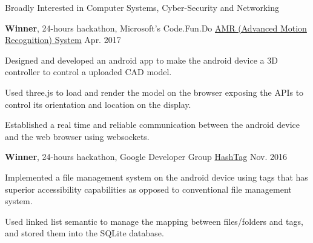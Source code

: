 \documentclass[11pt, a4paper]{cv}
\begin{document}

\begin{cventries}
    \begin{flushleft}
        Broadly Interested in Computer Systems, Cyber-Security and Networking
    \end{flushleft}
\end{cventries}


\begin{cventries}

  \cventry
  {\textbf{Winner}, 24-hours hackathon, Microsoft's Code.Fun.Do} %
        {\href{https://github.com/shivnshu/AMR-System}{AMR (Advanced Motion Recognition) System}} %
    {} %
    {Apr. 2017} %
    {
      \begin{cvitems} %
        \item {Designed and developed an android app to make the android device a 3D controller to control a uploaded CAD model.}
        \item {Used three.js to load and render the model on the browser exposing the APIs to control its orientation and location on the display.}
        \item {Established a real time and reliable communication between the android device and the web browser using websockets.}
      \end{cvitems}
    }

%
  \cventry
  {\textbf{Winner}, 24-hours hackathon, Google Developer Group} %
        {\href{https://github.com/shivnshu/hashtag}{HashTag}} %
    {} %
    {Nov. 2016} %
    {
      \begin{cvitems} %
        \item {Implemented a file management system on the android device using tags that has superior accessibility capabilities as opposed to conventional file management system.}
        \item {Used linked list semantic to manage the mapping between files/folders and tags, and stored them into the SQLite database.}
      \end{cvitems}
    }

\end{cventries}
\end{document}
